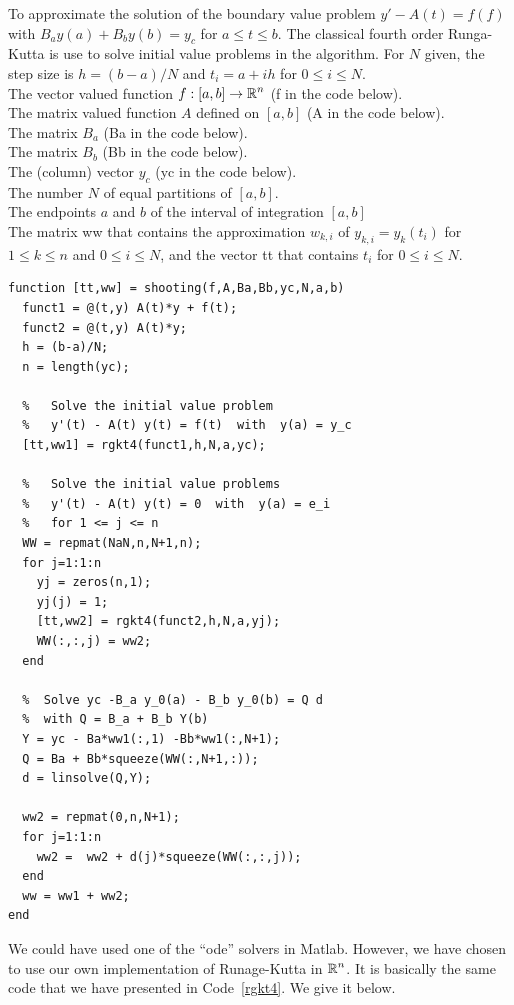 \begin{code}
To approximate the solution of the boundary value problem
$y' - A(t) = f(f)$ with $B_a y(a) + B_b y(b) = y_c$  for $a \leq t \leq b$.
The classical fourth order Runga-Kutta is use to solve initial value
problems in the algorithm.  For $N$ given, the step size is $h = (b-a)/N$ and
$t_i = a + i h $ for  $0 \leq i \leq N$.\\
 The vector valued function
$\displaystyle f:[a,b] \to \mathbb{R}^n$ (f in the code below).\\
The \nn matrix valued function $A$ defined on $[a,b]$ (A in the code below).\\
The \nn matrix $B_a$ (Ba in the code below).\\
The \nn matrix $B_b$ (Bb in the code below).\\
The (column) vector $y_c$ (yc in the code below).\\
The number $N$ of equal partitions of $[a,b]$.\\
The endpoints $a$ and $b$ of the interval of integration $[a,b]$ \\
 The  matrix ww that contains the
approximation $w_{k,i}$ of $y_{k,i} = y_k(t_i)$ for $1 \leq k \leq n$
and $0 \leq i \leq N$, and the vector tt that contains
$t_i$ for $0 \leq i \leq N$.
\small
\begin{verbatim}
function [tt,ww] = shooting(f,A,Ba,Bb,yc,N,a,b)
  funct1 = @(t,y) A(t)*y + f(t);
  funct2 = @(t,y) A(t)*y; 
  h = (b-a)/N;
  n = length(yc);

  %   Solve the initial value problem
  %   y'(t) - A(t) y(t) = f(t)  with  y(a) = y_c
  [tt,ww1] = rgkt4(funct1,h,N,a,yc);

  %   Solve the initial value problems
  %   y'(t) - A(t) y(t) = 0  with  y(a) = e_i
  %   for 1 <= j <= n
  WW = repmat(NaN,n,N+1,n);
  for j=1:1:n
    yj = zeros(n,1);
    yj(j) = 1;
    [tt,ww2] = rgkt4(funct2,h,N,a,yj);
    WW(:,:,j) = ww2;
  end

  %  Solve yc -B_a y_0(a) - B_b y_0(b) = Q d
  %  with Q = B_a + B_b Y(b)
  Y = yc - Ba*ww1(:,1) -Bb*ww1(:,N+1);
  Q = Ba + Bb*squeeze(WW(:,N+1,:));
  d = linsolve(Q,Y);

  ww2 = repmat(0,n,N+1);
  for j=1:1:n
    ww2 =  ww2 + d(j)*squeeze(WW(:,:,j));
  end
  ww = ww1 + ww2;
end
\end{verbatim}
\end{code}

We could have used one of the ``ode'' solvers in Matlab.  However, we
have chosen to use our own implementation of Runage-Kutta in
$\displaystyle \mathbb{R}^n$.  It is basically the same code that we have presented in
Code~\ref{rgkt4}.  We give it below.

